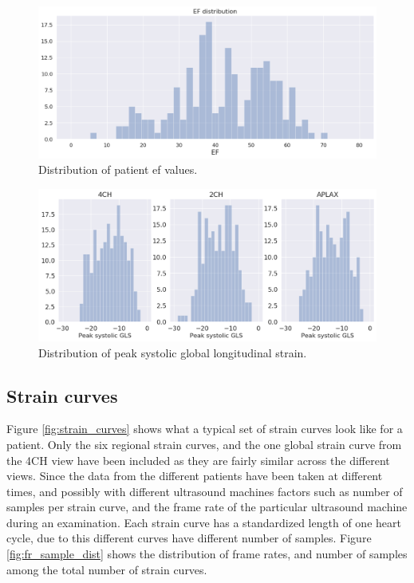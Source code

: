 \begin{figure}[h]
    \begin{center}
    \includegraphics[width=\textwidth]{data-exp/EF_dist.png}
    \end{center}
    \caption{Distribution of patient \acrshort{ef} values.}
    \label{fig:EF_dist}
\end{figure}

\begin{figure}
    \begin{center}
    \includegraphics[width=\textwidth]{data-exp/peak_sys_gls_dist.png}
    \end{center}
    \caption{Distribution of peak systolic global longitudinal strain.}
    \label{fig:gls_dist}
\end{figure}

\subsection{Strain curves}
Figure \ref{fig:strain_curves} shows what a typical set of strain curves look like for a patient. 
Only the six regional strain curves, and the one global strain curve from the 4CH view have been included as they are fairly similar across the different views. 
Since the data from the different patients have been taken at different times, and possibly with different ultrasound machines 
factors such as number of samples per strain curve, and the frame rate of the particular ultrasound machine during an examination. 
Each strain curve has a standardized length of one heart cycle, due to this different curves have different number of samples. 
Figure \ref{fig:fr_sample_dist} shows the distribution of frame rates, and number of samples among the total number of strain curves. \bigskip

